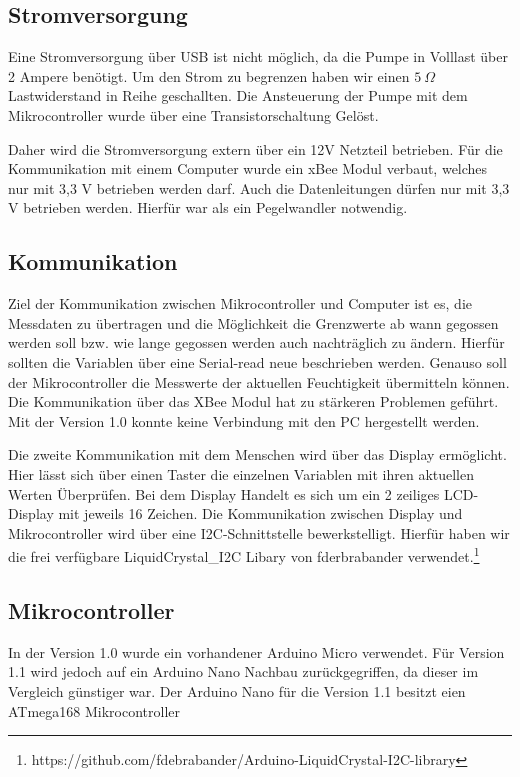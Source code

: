 \documentclass[]{IEEEtran}
\begin{document}
\subsection{Stromversorgung}
Eine Stromversorgung über USB ist nicht möglich, da die Pumpe in Volllast über 2 Ampere benötigt. Um den Strom zu begrenzen haben wir einen \begin{math}5~\Omega\end{math} Lastwiderstand in Reihe geschallten. Die Ansteuerung der Pumpe mit dem Mikrocontroller wurde über eine Transistorschaltung Gelöst. 

Daher wird die Stromversorgung extern über ein 12V Netzteil betrieben. Für die Kommunikation mit einem Computer wurde ein xBee Modul verbaut, welches nur mit 3,3 V betrieben werden darf. Auch die Datenleitungen dürfen nur mit 3,3 V betrieben werden. Hierfür war als ein Pegelwandler notwendig.
		
\subsection{Kommunikation}
Ziel der Kommunikation zwischen Mikrocontroller und Computer ist es, die Messdaten zu übertragen und die Möglichkeit die Grenzwerte ab wann gegossen werden soll bzw. wie lange gegossen werden auch nachträglich zu ändern. Hierfür sollten die Variablen über eine Serial-read neue beschrieben werden. Genauso soll der Mikrocontroller die Messwerte der aktuellen  Feuchtigkeit übermitteln können. Die Kommunikation über das XBee Modul hat zu stärkeren Problemen geführt. Mit der Version 1.0 konnte keine Verbindung mit den PC hergestellt werden.
		
Die zweite Kommunikation mit dem Menschen wird über das Display ermöglicht. Hier lässt sich über einen Taster die einzelnen Variablen mit ihren aktuellen Werten Überprüfen. Bei dem Display Handelt es sich um ein 2 zeiliges LCD-Display mit jeweils 16 Zeichen. Die Kommunikation zwischen Display und Mikrocontroller wird über eine I2C-Schnittstelle bewerkstelligt. Hierfür haben wir die frei verfügbare LiquidCrystal\_I2C Libary von fderbrabander verwendet.\footnote{https://github.com/fdebrabander/Arduino-LiquidCrystal-I2C-library}
		
\subsection{Mikrocontroller}
In der Version 1.0 wurde ein vorhandener Arduino Micro verwendet. Für Version 1.1 wird jedoch auf ein Arduino Nano Nachbau zurückgegriffen, da dieser im Vergleich günstiger war. Der Arduino Nano für die Version 1.1 besitzt eien ATmega168 Mikrocontroller
	
\end{document}
